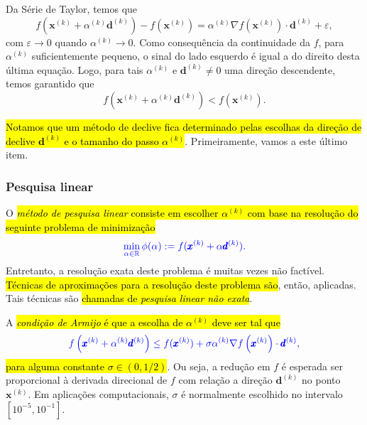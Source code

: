 \begin{obs}
  Da Série de Taylor{\taylor}, temos que
  \begin{equation}
    f(\pmb{x}^{(k)}+\alpha^{(k)}\pmb{d}^{(k)}) - f(\pmb{x}^{(k)}) = \alpha^{(k)}\nabla f(\pmb{x}^{(k)})\cdot \pmb{d}^{(k)} + \varepsilon,
  \end{equation}
  com $\varepsilon\to 0$ quando $\alpha^{(k)}\to 0$. Como consequência da continuidade da $f$, para $\alpha^{(k)}$ suficientemente pequeno, o sinal do lado esquerdo é igual a do direito desta última equação. Logo, para tais $\alpha^{(k)}$ e $\pmb{d}^{(k)}\neq 0$ uma direção descendente, temos garantido que
  \begin{equation}
    f(\pmb{x}^{(k)}+\alpha^{(k)}\pmb{d}^{(k)}) < f(\pmb{x}^{(k)}).
  \end{equation}
\end{obs}


\hl{Notamos que um método de declive fica determinado pelas escolhas da direção de declive $\pmb{d}^{(k)}$ e o tamanho do passo $\alpha^{(k)}$}. Primeiramente, vamos a este último item.

\subsubsection{Pesquisa linear}
\badgeRevisar

O \hl{\emph{método de pesquisa linear} consiste em escolher $\alpha^{(k)}$ com base na resolução do seguinte problema de minimização}
\begin{equation}\color{blue}\min_{\alpha\in\mathbb{R}} \phi(\alpha) := f(\pmb{x}^{(k)}+\alpha \pmb{d}^{(k)}).
\end{equation}
Entretanto, a resolução exata deste problema é muitas vezes não factível. \hl{Técnicas de aproximações para a resolução deste problema são}, então, aplicadas. Tais técnicas são \hl{chamadas de \emph{pesquisa linear não exata}}.

A \hl{\emph{condição de Armijo} é que a escolha de $\alpha^{(k)}$ deve ser tal que}
\begin{equation} \label{eq:condArmijo}\color{blue}f\left(\pmb{x}^{(k)}+\alpha^{(k)} \pmb{d}^{(k)}\right) \leq f(\pmb{x}^{(k)}) + \sigma \alpha^{(k)} \nabla f\left(\pmb{x}^{(k)}\right)\cdot \pmb{d}^{(k)},
\end{equation}
\hl{para alguma constante $\sigma\in (0, 1/2)$}. Ou seja, a redução em $f$ é esperada ser proporcional à derivada direcional de $f$ com relação a direção $\pmb{d}^{(k)}$ no ponto $\pmb{x}^{(k)}$. Em aplicações computacionais, $\sigma$ é normalmente escolhido no intervalo $[10^{-5}, 10^{-1}]$.

